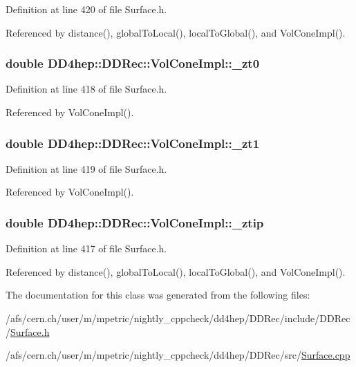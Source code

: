 Definition at line 420 of file Surface.h.

Referenced by distance(), globalToLocal(), localToGlobal(), and VolConeImpl().\hypertarget{class_d_d4hep_1_1_d_d_rec_1_1_vol_cone_impl_ad204cc67411301eaa8f135430392a55c}{
\subsubsection[{\_\-zt0}]{\setlength{\rightskip}{0pt plus 5cm}double {\bf DD4hep::DDRec::VolConeImpl::\_\-zt0}}}
\label{class_d_d4hep_1_1_d_d_rec_1_1_vol_cone_impl_ad204cc67411301eaa8f135430392a55c}


Definition at line 418 of file Surface.h.

Referenced by VolConeImpl().\hypertarget{class_d_d4hep_1_1_d_d_rec_1_1_vol_cone_impl_aa9466fe65e7238bf90ec604132ea1825}{
\subsubsection[{\_\-zt1}]{\setlength{\rightskip}{0pt plus 5cm}double {\bf DD4hep::DDRec::VolConeImpl::\_\-zt1}}}
\label{class_d_d4hep_1_1_d_d_rec_1_1_vol_cone_impl_aa9466fe65e7238bf90ec604132ea1825}


Definition at line 419 of file Surface.h.

Referenced by VolConeImpl().\hypertarget{class_d_d4hep_1_1_d_d_rec_1_1_vol_cone_impl_ae42d0cc1db6c972c012f3177cdeb935b}{
\subsubsection[{\_\-ztip}]{\setlength{\rightskip}{0pt plus 5cm}double {\bf DD4hep::DDRec::VolConeImpl::\_\-ztip}}}
\label{class_d_d4hep_1_1_d_d_rec_1_1_vol_cone_impl_ae42d0cc1db6c972c012f3177cdeb935b}


Definition at line 417 of file Surface.h.

Referenced by distance(), globalToLocal(), localToGlobal(), and VolConeImpl().

The documentation for this class was generated from the following files:\begin{DoxyCompactItemize}
\item 
/afs/cern.ch/user/m/mpetric/nightly\_\-cppcheck/dd4hep/DDRec/include/DDRec/\hyperlink{_surface_8h}{Surface.h}\item 
/afs/cern.ch/user/m/mpetric/nightly\_\-cppcheck/dd4hep/DDRec/src/\hyperlink{_surface_8cpp}{Surface.cpp}\end{DoxyCompactItemize}
